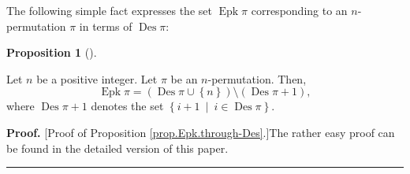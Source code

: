 \documentclass[numbers=enddot,12pt,final,onecolumn,notitlepage]{scrartcl}%
\theoremstyle{definition}
\newtheorem{prop}[theo]{Proposition}
\newenvironment{proposition}[1][]
{\begin{prop}[#1]\begin{leftbar}}
{\end{leftbar}\end{prop}}
\newenvironment{proof}[1][Proof]{\noindent\textbf{#1.} }{\ \rule{0.5em}{0.5em}}
\newenvironment{vershort}{}{}
\begin{document}
The following simple fact expresses the set $\operatorname{Epk}\pi$
corresponding to an $n$-permutation $\pi$ in terms of $\operatorname{Des}\pi$:

\begin{proposition}
\label{prop.Epk.through-Des}Let $n$ be a positive integer. Let $\pi$ be an
$n$-permutation. Then,%
\[
\operatorname{Epk}\pi=\left(  \operatorname{Des}\pi\cup\left\{  n\right\}
\right)  \setminus\left(  \operatorname{Des}\pi+1\right)  ,
\]
where $\operatorname{Des}\pi+1$ denotes the set $\left\{  i+1\ \mid
\ i\in\operatorname{Des}\pi\right\}  $.
\end{proposition}

\begin{vershort}
\begin{proof}
[Proof of Proposition \ref{prop.Epk.through-Des}.]The rather easy proof can be
found in the detailed version \cite{verlong} of this paper.
\end{proof}
\end{vershort}
\end{document}
